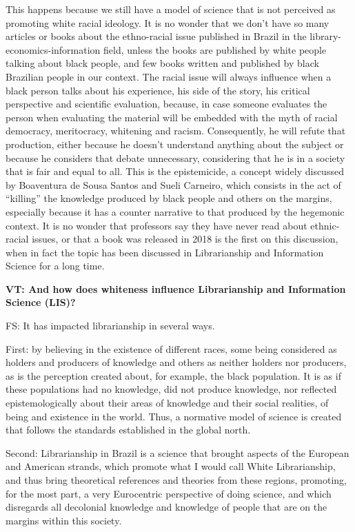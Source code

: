 \documentclass[a4paper,
fontsize=11pt,
oneside,
numbers=noperiodatend,
parskip=half-,
bibliography=totoc,
final
]{scrartcl}
\begin{document}
This happens because we still have a model of science that is not
perceived as promoting white racial ideology. It is no wonder that we
don't have so many articles or books about the ethno-racial issue
published in Brazil in the library-economics-information field, unless
the books are published by white people talking about black people, and
few books written and published by black Brazilian people in our
context. The racial issue will always influence when a black person
talks about his experience, his side of the story, his critical
perspective and scientific evaluation, because, in case someone
evaluates the person when evaluating the material will be embedded with
the myth of racial democracy, meritocracy, whitening and racism.
Consequently, he will refute that production, either because he doesn't
understand anything about the subject or because he considers that
debate unnecessary, considering that he is in a society that is fair and
equal to all. This is the epistemicide, a concept widely discussed by
Boaventura de Sousa Santos and Sueli Carneiro, which consists in the act
of \enquote{killing} the knowledge produced by black people and others on the
margins, especially because it has a counter narrative to that produced
by the hegemonic context. It is no wonder that professors say they have
never read about ethnic-racial issues, or that a book was released in
2018 is the first on this discussion, when in fact the topic has been
discussed in Librarianship and Information Science for a long time.

\textbf{VT: And how does whiteness influence Librarianship and
Information Science (LIS)?}

FS: It has impacted librarianship in several ways.

First: by believing in the existence of different races, some being
considered as holders and producers of knowledge and others as neither
holders nor producers, as is the perception created about, for example,
the black population. It is as if these populations had no knowledge,
did not produce knowledge, nor reflected epistemologically about their
areas of knowledge and their social realities, of being and existence in
the world. Thus, a normative model of science is created that follows
the standards established in the global north.

Second: Librarianship in Brazil is a science that brought aspects of the
European and American strands, which promote what I would call White
Librarianship, and thus bring theoretical references and theories from
these regions, promoting, for the most part, a very Eurocentric
perspective of doing science, and which disregards all decolonial
knowledge and knowledge of people that are on the margins within this
society.
\end{document}
